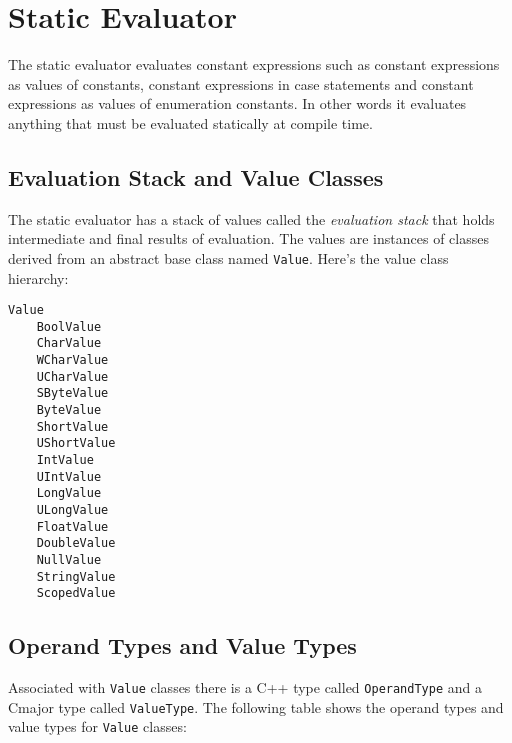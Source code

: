 \documentclass[a4paper,oneside,11pt]{book}
\theoremstyle{definition}
\begin{document}
\chapter{Static Evaluator}\label{evaluator}

The static evaluator evaluates constant expressions such as constant expressions as values of constants,
constant expressions in case statements and constant expressions as values of enumeration constants.
In other words it evaluates anything that must be evaluated statically at compile time.

\section{Evaluation Stack and Value Classes}

The static evaluator has a stack of values called the \emph{evaluation stack} that holds intermediate and final results of evaluation.
The values are instances of classes derived from an abstract base class named \verb|Value|.
Here's the value class hierarchy:

\begin{verbatim}
Value
    BoolValue
    CharValue
    WCharValue
    UCharValue
    SByteValue
    ByteValue
    ShortValue
    UShortValue
    IntValue
    UIntValue
    LongValue
    ULongValue
    FloatValue
    DoubleValue
    NullValue
    StringValue
    ScopedValue
\end{verbatim}

\section{Operand Types and Value Types}

Associated with \verb|Value| classes there is a C++ type called \verb|OperandType| and a Cmajor type called \verb|ValueType|.
The following table shows the operand types and value types for \verb|Value| classes:
\end{document}
